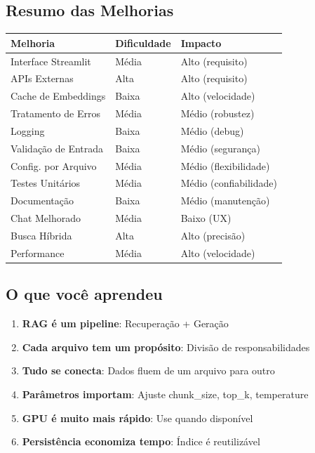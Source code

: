 \documentclass[12pt,a4paper]{article}
\begin{document}
\subsection{Resumo das Melhorias}

\begin{table}[h]
    \centering
    \begin{tabular}{|l|l|l|}
        \hline
        \textbf{Melhoria} & \textbf{Dificuldade} & \textbf{Impacto} \\
        \hline
        Interface Streamlit & Média & Alto (requisito) \\
        APIs Externas & Alta & Alto (requisito) \\
        Cache de Embeddings & Baixa & Alto (velocidade) \\
        Tratamento de Erros & Média & Médio (robustez) \\
        Logging & Baixa & Médio (debug) \\
        Validação de Entrada & Baixa & Médio (segurança) \\
        Config. por Arquivo & Média & Médio (flexibilidade) \\
        Testes Unitários & Média & Médio (confiabilidade) \\
        Documentação & Baixa & Médio (manutenção) \\
        Chat Melhorado & Média & Baixo (UX) \\
        Busca Híbrida & Alta & Alto (precisão) \\
        Performance & Média & Alto (velocidade) \\
        \hline
    \end{tabular}
\end{table}


\subsection{O que você aprendeu}

\begin{enumerate}
    \item \textbf{RAG é um pipeline}: Recuperação + Geração
    \item \textbf{Cada arquivo tem um propósito}: Divisão de responsabilidades
    \item \textbf{Tudo se conecta}: Dados fluem de um arquivo para outro
    \item \textbf{Parâmetros importam}: Ajuste chunk\_size, top\_k, temperature
    \item \textbf{GPU é muito mais rápido}: Use quando disponível
    \item \textbf{Persistência economiza tempo}: Índice é reutilizável
\end{enumerate}
\end{document}
